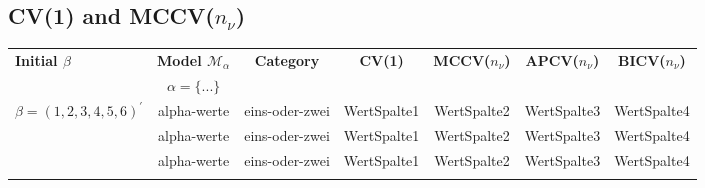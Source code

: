 \documentclass[Research_Module_ES.tex]{subfiles}
\begin{document}
\subsection{CV(1) and MCCV($n_{\nu}$)}
\begin{table}[htb]
	\begin{tabular}{lcccccc}
		\toprule
		\midrule
		\textbf{\scriptsize Initial $\beta$}
		&\textbf{\scriptsize Model $\mathcal{M}_\alpha$}&\textbf{\scriptsize Category}
		&\textbf{\scriptsize CV(1)}
		&\textbf{\scriptsize MCCV($n_\nu$)}
		&\textbf{\scriptsize APCV($n_\nu$)}
		&\textbf{\scriptsize BICV($n_\nu$)}\\
		$~$ &\textbf{\scriptsize $\alpha=\{...\}$} 
		\\\midrule\midrule
		
		{\scriptsize $\beta=(1,2,3,4,5,6)^\prime$}& \scriptsize alpha-werte & \scriptsize eins-oder-zwei &\scriptsize WertSpalte1 & \scriptsize WertSpalte2 &\scriptsize WertSpalte3 & \scriptsize WertSpalte4\\
		
		~& \scriptsize alpha-werte & \scriptsize eins-oder-zwei &\scriptsize WertSpalte1 & \scriptsize WertSpalte2 &\scriptsize WertSpalte3 & \scriptsize WertSpalte4\\
		
		~& \scriptsize alpha-werte &\scriptsize eins-oder-zwei & \scriptsize WertSpalte1 &\scriptsize WertSpalte2 & \scriptsize WertSpalte3 &\scriptsize WertSpalte4\\
		& & & & & &\\
		

\end{tabular}
\end{table}
\end{document}
